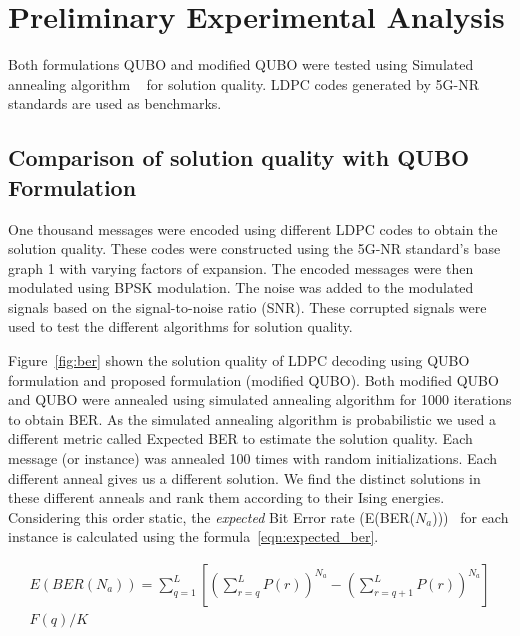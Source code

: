 \section{Preliminary Experimental Analysis}
\label{sec:evaluations}


Both formulations QUBO and modified QUBO were tested using Simulated annealing algorithm ~\cite{Kirkpatrick671} for solution quality. LDPC codes generated by 5G-NR standards are used as benchmarks. 

\subsection{Comparison of solution quality with QUBO Formulation }\label{sec:solution_quality}

One thousand messages were encoded using different LDPC codes to obtain the solution quality. These codes were constructed using the 5G-NR standard's base graph 1 with varying factors of expansion. The encoded messages were then modulated using BPSK modulation. The noise was added to the modulated signals based on the signal-to-noise ratio (SNR). These corrupted signals were used to test the different algorithms for solution quality. 

Figure~\ref{fig:ber} shown the solution quality of LDPC decoding using QUBO formulation and proposed formulation (modified QUBO). Both modified QUBO and QUBO were annealed using simulated annealing algorithm for 1000 iterations to obtain BER. As the simulated annealing algorithm is  probabilistic we used a different metric called Expected BER to estimate the solution quality. Each message (or instance) was annealed 100 times with random initializations. Each different anneal gives us a different solution. We find the distinct solutions in these different anneals and rank them according to their Ising energies. Considering this order static, the \textit{expected} Bit Error rate (E(BER($N_a$)))~\cite{kim2019leveraging} for each instance is calculated using the formula~\ref{eqn:expected_ber}.

\begin{equation}\label{eqn:expected_ber}
\begin{split}
E(BER(N_a)) = \sum_{q=1}^{L} \left[ (\sum_{r=q}^{L} P(r))^{N_a} -  (\sum_{r=q+1}^{L} P(r))^{N_a}\right] \\ F(q)/K    
\end{split}
\end{equation}

